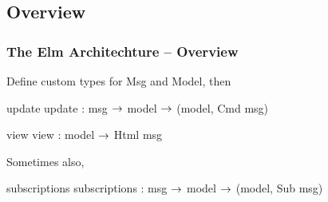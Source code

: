 \subsection{Overview}
    \begin{frame}
        \frametitle{The Elm Architechture -- Overview}
        Define custom types for Msg and Model, then
        \begin{block}{update}
            update : msg $\rightarrow$ model $\rightarrow$ (model, Cmd msg)
        \end{block}
        \begin{block}{view}
            view : model $\rightarrow$ Html msg
        \end{block}
        Sometimes also,
        \begin{block}{subscriptions}
            subscriptions : msg $\rightarrow$ model $\rightarrow$ (model, Sub msg)
        \end{block}
    \end{frame}